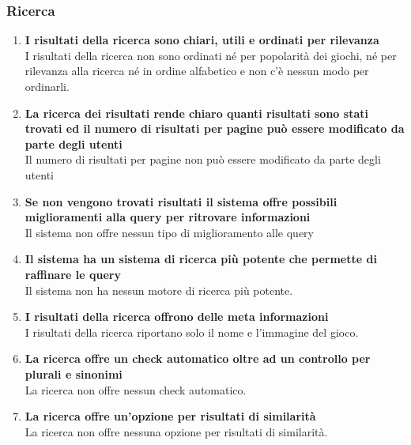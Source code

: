 \documentclass[../Report.tex]{subfiles}
\begin{document}
    \subsubsection{Ricerca}
    \begin{enumerate}
        \item \textbf{I risultati della ricerca sono chiari, utili e ordinati per rilevanza}\\
        I risultati della ricerca non sono ordinati né per popolarità dei giochi, né per rilevanza alla ricerca né in ordine alfabetico e non c’è nessun modo per ordinarli. 

        \item \textbf{La ricerca dei risultati rende chiaro quanti risultati sono stati trovati ed il numero di risultati per pagine può essere modificato da parte degli utenti} \\
        Il numero di risultati per pagine non può essere modificato da parte degli utenti
        \item \textbf{Se non vengono trovati risultati il sistema offre possibili miglioramenti alla query per ritrovare informazioni }\\
        Il sistema non offre nessun tipo di miglioramento alle query
        \item \textbf{Il sistema ha un sistema di ricerca più potente che permette di raffinare le query}\\
        Il sistema non ha nessun motore di ricerca più potente.
        \item \textbf{I risultati della ricerca offrono delle meta informazioni}\\
        I risultati della ricerca riportano solo il nome e l’immagine del gioco. 
        \item \textbf{La ricerca offre un check automatico oltre ad un controllo per plurali e sinonimi }\\
        La ricerca non offre nessun check automatico.
        \item \textbf{La ricerca offre un’opzione per risultati di similarità}\\
        La ricerca non offre nessuna opzione per risultati di similarità.        
    \end{enumerate}
\end{document}
